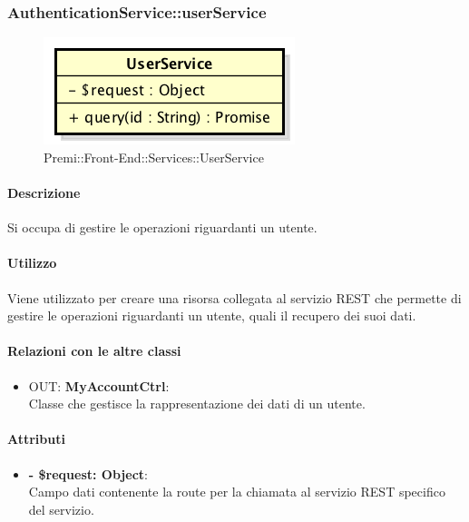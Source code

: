 		
		\subsubsection{AuthenticationService::userService}
		\begin{figure}[h]
			\centering
				\includegraphics[width=0.4\linewidth]{img/premi_front_end_services_userservice}
			\caption[Premi::Front-End::Services::UserService]{Premi::Front-End::Services::UserService}
		\end{figure}
		
		\paragraph{Descrizione}
		Si occupa di gestire le operazioni riguardanti un utente.
		
		\paragraph{Utilizzo}
		Viene utilizzato per creare una risorsa collegata al servizio \gls{REST} che permette di gestire le operazioni riguardanti un utente, quali il recupero dei suoi dati.
		
		\paragraph{Relazioni con le altre classi}
		\begin{itemize}
			\item OUT: \textbf{MyAccountCtrl}:\\
			Classe che gestisce la rappresentazione dei dati di un utente.
		\end{itemize}
		
		\paragraph{Attributi}
		\begin{itemize}
			\item \textbf{- \$request: Object}:\\
			Campo dati contenente la route per la chiamata al servizio \gls{REST} specifico del servizio.
		\end{itemize}	
		
